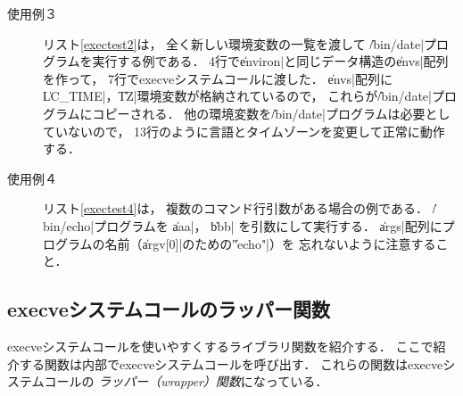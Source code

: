 \begin{description}
\item[使用例３]
  リスト\ref{exectest2}は，
  全く新しい環境変数の一覧を渡して
  \|/bin/date|プログラムを実行する例である．
  4行で\|environ|と同じデータ構造の\|envs|配列を作って，
  7行でexecveシステムコールに渡した．
  \|envs|配列に\|LC_TIME|，\|TZ|環境変数が格納されているので，
  これらが\|/bin/date|プログラムにコピーされる．
  他の環境変数を\|/bin/date|プログラムは必要としていないので，
  13行のように言語とタイムゾーンを変更して正常に動作する．

  

\item[使用例４]
  リスト\ref{exectest4}は，
  複数のコマンド行引数がある場合の例である．
  \|/bin/echo|プログラムを \|aaa|， \|bbb| を引数にして実行する．
  \|args|配列にプログラムの名前（\|argv[0]|のための\|"echo"|）を
  忘れないように注意すること．

  

\end{description}

\subsection{execveシステムコールのラッパー関数}
execveシステムコールを使いやすくするライブラリ関数を紹介する．
ここで紹介する関数は内部でexecveシステムコールを呼び出す．
これらの関数はexecveシステムコールの
\emph{ラッパー（wrapper）関数}になっている．


